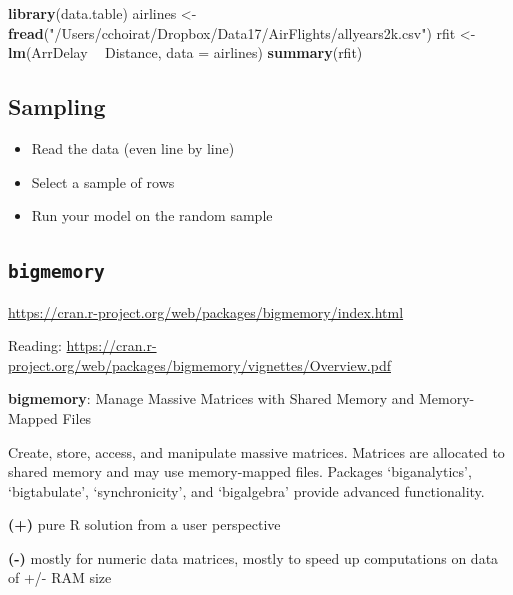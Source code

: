 \documentclass[]{book}
\newenvironment{Shaded}{\begin{snugshade}}{\end{snugshade}}
\newcommand{\KeywordTok}[1]{\textcolor[rgb]{0.13,0.29,0.53}{\textbf{#1}}}
\newcommand{\DataTypeTok}[1]{\textcolor[rgb]{0.13,0.29,0.53}{#1}}
\newcommand{\StringTok}[1]{\textcolor[rgb]{0.31,0.60,0.02}{#1}}
\newcommand{\OperatorTok}[1]{\textcolor[rgb]{0.81,0.36,0.00}{\textbf{#1}}}
\newcommand{\NormalTok}[1]{#1}
\providecommand{\tightlist}{%
  \setlength{\itemsep}{0pt}\setlength{\parskip}{0pt}}
\theoremstyle{definition}
\theoremstyle{definition}
\theoremstyle{definition}
\theoremstyle{remark}
\begin{document}
\begin{Shaded}
\begin{Highlighting}[]
\KeywordTok{library}\NormalTok{(data.table)}
\NormalTok{airlines <-}\StringTok{ }\KeywordTok{fread}\NormalTok{(}\StringTok{"/Users/cchoirat/Dropbox/Data17/AirFlights/allyears2k.csv"}\NormalTok{)}
\NormalTok{rfit <-}\StringTok{ }\KeywordTok{lm}\NormalTok{(ArrDelay }\OperatorTok{~}\StringTok{ }\NormalTok{Distance, }\DataTypeTok{data =}\NormalTok{ airlines)}
\KeywordTok{summary}\NormalTok{(rfit)}
\end{Highlighting}
\end{Shaded}

\subsection{Sampling}\label{sampling}

\begin{itemize}
\tightlist
\item
  Read the data (even line by line)
\item
  Select a sample of rows
\item
  Run your model on the random sample
\end{itemize}

\subsection{\texorpdfstring{\texttt{bigmemory}}{bigmemory}}\label{bigmemory}

\url{https://cran.r-project.org/web/packages/bigmemory/index.html}

Reading:
\url{https://cran.r-project.org/web/packages/bigmemory/vignettes/Overview.pdf}

\textbf{bigmemory}: Manage Massive Matrices with Shared Memory and
Memory-Mapped Files

Create, store, access, and manipulate massive matrices. Matrices are
allocated to shared memory and may use memory-mapped files. Packages
`biganalytics', `bigtabulate', `synchronicity', and `bigalgebra' provide
advanced functionality.

\textbf{(+)} pure R solution from a user perspective

\textbf{(-)} mostly for numeric data matrices, mostly to speed up
computations on data of +/- RAM size
\end{document}
